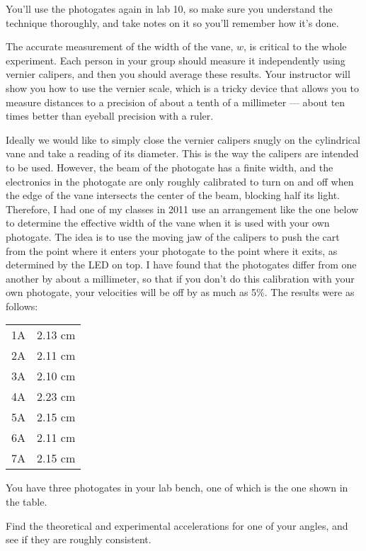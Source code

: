 You'll use the photogates again in lab 10, so make sure you understand
the technique thoroughly, and take notes on it so you'll remember how it's
done.

The accurate measurement of the width of the vane, $w$, is critical
to the whole experiment. Each person in your group should measure
it independently using vernier calipers, and then you should average
these results. Your instructor will show you how to use the vernier
scale, which is a tricky device that allows you to measure distances
to a precision of about a tenth of a millimeter --- about ten times better than
eyeball precision with a ruler.

Ideally we would like to simply close the vernier calipers snugly on the
cylindrical vane and take a reading of its diameter. This is the way the
calipers are intended to be used. However, the beam of the photogate
has a finite width, and the electronics in the photogate are only roughly
calibrated to turn on and off when the edge of the vane intersects the
center of the beam, blocking half its light. Therefore, I had one of my classes in 2011 use
an arrangement like the one below to determine the effective width of the
vane when it is used with your own photogate. The idea is to use the moving jaw of the calipers
to push the cart from the point where it enters your photogate to the point
where it exits, as determined by the LED on top. I have found that the
photogates differ from one another by about a millimeter, so that if you
don't do this calibration with your own photogate, your velocities will be
off by as much as 5\%. The results were as follows:

\noindent \begin{tabular}{ll}
1A & 2.13 cm \\
2A & 2.11 cm \\
3A & 2.10 cm \\
4A & 2.23 cm \\
5A & 2.15 cm \\
6A & 2.11 cm \\
7A & 2.15 cm
\end{tabular}

\noindent You have three photogates in your lab bench, one of which is the one
shown in the table.


\selfcheck

Find the theoretical and experimental accelerations for one
of your angles, and see if they are roughly consistent.

